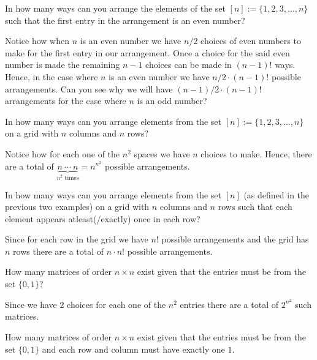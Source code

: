 \begin{question}
	In how many ways can you arrange the elements of the set $[n]:=\{1,2,3,\ldots,n\}$ such that the first entry in the arrangement is an even number?
	\label{q:1.1}
\end{question}
\begin{solution}
Notice how when $n$ is an even number we have $n/2$ choices of even numbers to make for the first entry in our arrangement. Once a choice for the said even number is made the remaining $n-1$ choices can be made in $\left( n-1 \right)!$ ways. Hence, in the case where $n$ is an even number we have $n/2 \cdot \left(n-1 \right)!$ possible arrangements. Can you see why we will have $\left( n-1 \right)/2 \cdot \left( n-1 \right)!$ arrangements for the case where $n$ is an odd number?
\end{solution}
\begin{question}
    In how many ways can you arrange elements from the set $[n]:=\{1,2,3,\ldots,n\}$ on a grid with $n$ columns and $n$ rows?
\end{question}
\begin{solution}
Notice how for each one of the $n^2$ spaces we have $n$ choices to make. Hence, there are a total of $\underbrace{n \ \cdots \ n}_{n^2 \text{ times}} = n^{n^2}$ possible arrangements.
\end{solution}
\begin{question}
In how many ways can you arrange elements from the set $[n]$ (as defined in the previous two examples) on a grid with $n$ columns and $n$ rows such that each element appears atleast(/exactly) once in each row?
\end{question}
\begin{solution}
Since for each row in the grid we have $n!$ possible arrangements and the grid has $n$ rows there are a total of $n\cdot n!$ possible arrangements.
\end{solution}
\begin{question}
How many matrices of order $n\times n$ exist given that the entries must be from the set $\{0,1\}$? 
\end{question}
\begin{solution}
Since we have $2$ choices for each one of the $n^2$ entries there are a total of $2^{n^2}$ such matrices.
\end{solution}
	\begin{question}
\label{q:1.5}
	How many matrices of order $n \times n$ exist given that the entries must be from the set $\{0,1\}$ and each row and column must have exactly one $1$.
\end{question}
